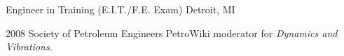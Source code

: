 \documentclass{resume}
\begin{document}
		
                {Engineer in Training (E.I.T./F.E. Exam)}
                {Detroit, MI}
        

		
                \catentrymembership
        {2008}
        {Society of Petroleum Engineers}
    {PetroWiki moderator for \emph{Dynamics and Vibrations}.}
            

        
\end{document}
